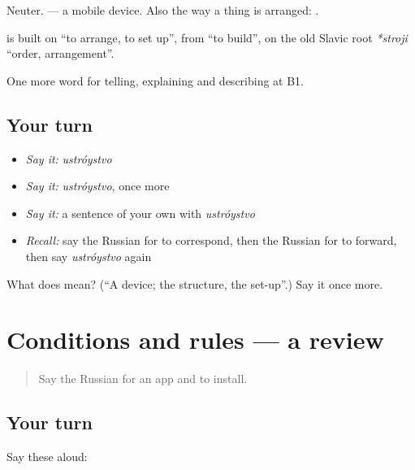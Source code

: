 Neuter. \emph{ } — a mobile device. Also the way a thing is arranged: \emph{ }.

\begin{cousinweb}
\textbf{} is built on \emph{} \textquotedblleft{}to arrange, to set up\textquotedblright{}, from \emph{} \textquotedblleft{}to build\textquotedblright{}, on the old Slavic root \emph{*stroji} \textquotedblleft{}order, arrangement\textquotedblright{}.
\end{cousinweb}

\begin{grammarlens}[title={What you've built}]
One more word for telling, explaining and describing at B1.
\end{grammarlens}

\subsection*{Your turn}
\begin{itemize}
\raggedright
  \item \emph{Say it:} \emph{ustróystvo}
  \item \emph{Say it:} \emph{ustróystvo}, once more
  \item \emph{Say it:} a sentence of your own with \emph{ustróystvo}
  \item \emph{Recall:} say the Russian for to correspond, then the Russian for to forward, then say \emph{ustróystvo} again
\end{itemize}

\begin{tcolorbox}[breakable,colback=teal!4,colframe=teal!35!black,title={Before you move on}]
What does  mean? (\textquotedblleft{}A device; the structure, the set-up\textquotedblright{}.) Say it once more.
\end{tcolorbox}
\section[(dialogue)]{Conditions and rules — a review}

\label{lesson:RU-R402-review-401-402}



\begin{quote}
Say the Russian for an app and to install.
\end{quote}

\subsection*{Your turn}
Say these aloud:

